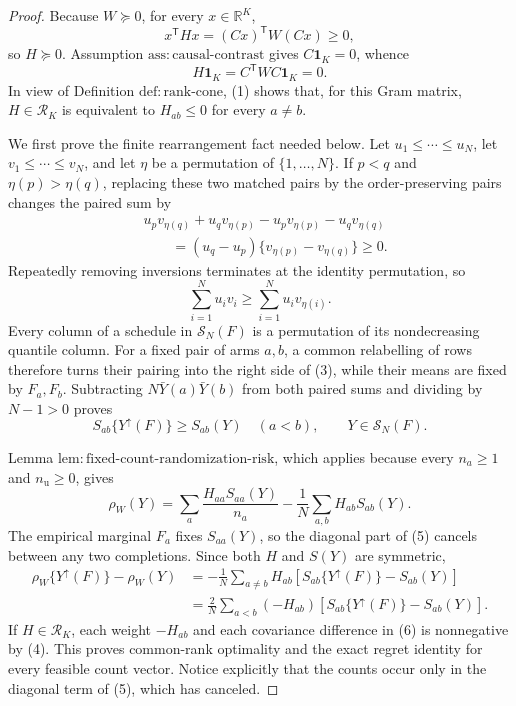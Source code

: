 \documentclass{article}
\begin{document}
\begin{proof}
Because \(W\succeq0\), for every \(x\in\mathbb R^K\),
\[
x^{\mathsf T}Hx=(Cx)^{\mathsf T}W(Cx)\geq0,
\]
so \(H\succeq0\).  Assumption \(\mathrm{ass{:}causal\text{-}contrast}\) gives \(C\mathbf 1_K=0\), whence
\[
H\mathbf 1_K=C^{\mathsf T}WC\mathbf 1_K=0. \tag{1}
\]
In view of Definition \(\mathrm{def{:}rank\text{-}cone}\), (1) shows that, for this Gram matrix, \(H\in\mathcal R_K\) is equivalent to \(H_{ab}\leq0\) for every \(a\ne b\).

We first prove the finite rearrangement fact needed below.  Let \(u_1\leq\cdots\leq u_N\), let \(v_1\leq\cdots\leq v_N\), and let \(\eta\) be a permutation of \(\{1,\ldots,N\}\).  If \(p<q\) and \(\eta(p)>\eta(q)\), replacing these two matched pairs by the order-preserving pairs changes the paired sum by
\[
\begin{aligned}
&u_pv_{\eta(q)}+u_qv_{\eta(p)}
-u_pv_{\eta(p)}-u_qv_{\eta(q)}\\
&\qquad=(u_q-u_p)\{v_{\eta(p)}-v_{\eta(q)}\}\geq0. \tag{2}
\end{aligned}
\]
Repeatedly removing inversions terminates at the identity permutation, so
\[
\sum_{i=1}^N u_iv_i\geq\sum_{i=1}^N u_iv_{\eta(i)}. \tag{3}
\]
Every column of a schedule in \(\mathcal S_N(F)\) is a permutation of its nondecreasing quantile column.  For a fixed pair of arms \(a,b\), a common relabelling of rows therefore turns their pairing into the right side of (3), while their means are fixed by \(F_a,F_b\).  Subtracting \(N\bar Y(a)\bar Y(b)\) from both paired sums and dividing by \(N-1>0\) proves
\[
S_{ab}\{Y^{\uparrow}(F)\}\geq S_{ab}(Y)
\quad(a<b),\qquad Y\in\mathcal S_N(F). \tag{4}
\]

Lemma \(\mathrm{lem{:}fixed\text{-}count\text{-}randomization\text{-}risk}\), which applies because every \(n_a\geq1\) and \(n_{\mathrm u}\geq0\), gives
\[
\rho_W(Y)=\sum_a\frac{H_{aa}S_{aa}(Y)}{n_a}
-\frac1N\sum_{a,b}H_{ab}S_{ab}(Y). \tag{5}
\]
The empirical marginal \(F_a\) fixes \(S_{aa}(Y)\), so the diagonal part of (5) cancels between any two completions.  Since both \(H\) and \(S(Y)\) are symmetric,
\[
\begin{aligned}
\rho_W\{Y^{\uparrow}(F)\}-\rho_W(Y)
&=-\frac1N\sum_{a\ne b}H_{ab}
\left[S_{ab}\{Y^{\uparrow}(F)\}-S_{ab}(Y)\right]\\
&=\frac2N\sum_{a<b}(-H_{ab})
\left[S_{ab}\{Y^{\uparrow}(F)\}-S_{ab}(Y)\right]. \tag{6}
\end{aligned}
\]
If \(H\in\mathcal R_K\), each weight \(-H_{ab}\) and each covariance difference in (6) is nonnegative by (4).  This proves common-rank optimality and the exact regret identity for every feasible count vector.  Notice explicitly that the counts occur only in the diagonal term of (5), which has canceled.


\end{proof}
\end{document}

